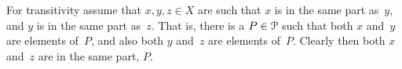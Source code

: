 \documentclass{test}  %
\begin{document}
\begin{problem}
\begin{exes}
\begin{answer}
  For transitivity assume that $x,y,z\in X$ are such that 
  $x$ is in the same part as~$y$, and 
  $y$ is in the same part as~$z$.
  That is, there is a $P\in\EuScript{P}$ such that
  both $x$ and~$y$ are elements of~$P$, 
  and also both $y$ and~$z$ are elements of~$P$.
  Clearly then both $x$ and~$z$ are in the same part, $P$.  
\end{answer}
\end{exes}
 





\end{problem}
\end{document}

